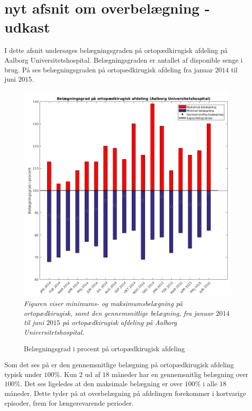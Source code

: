 \section{nyt afsnit om overbelægning - udkast}

I dette afsnit undersøges belægningsgraden på ortopædkirugisk afdeling på Aalborg Universitetshospital. Belægningsgraden er antallet af disponible senge i brug. På  ses belægningsgraden på ortopædkirugisk afdeling fra januar $2014$ til juni $2015$.

\begin{figure}[H]
	\flushleft 
	\caption{Belægningsgrad i procent på ortopædkirugisk afdeling}
	\centering
	\includegraphics[scale=.45]{figures/maxminoverbelaeg.png}
	\label{maxminbelaeg}
	\flushleft
	\textit{Figuren viser minimums- og maksimumsbelægning på ortopædkirugisk, samt den gennemsnitlige belægning, fra januar $2014$ til juni $2015$ på ortopædkirugisk afdeling på Aalborg Universitetshospital.}
\end{figure}

Som det ses på  er den gennemsnitlige belægning på ortopædkirugisk afdeling typisk under $100$\%. Kun $2$ ud af $18$ måneder har en gennemsnitlig belægning over $100$\%. Det ses ligeledes at den maksimale belægning er over $100$\% i alle $18$ måneder. Dette tyder på at overbelægning på afdelingen forekommer i kortvarige episoder, frem for længerevarende perioder.

